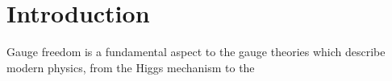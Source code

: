 \section{Introduction}
\label{sec:introduction}

Gauge freedom is a fundamental aspect to the gauge theories which describe
modern physics, from the Higgs mechanism\cite{higgs1964} to the 
